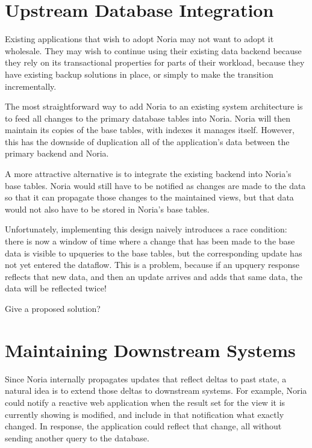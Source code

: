 \section{Upstream Database Integration}

Existing applications that wish to adopt Noria may not want to adopt it
wholesale. They may wish to continue using their existing data backend because
they rely on its transactional properties for parts of their workload, because
they have existing backup solutions in place, or simply to make the transition
incrementally.

The most straightforward way to add Noria to an existing system architecture is
to feed all changes to the primary database tables into Noria. Noria will then
maintain its copies of the base tables, with indexes it manages itself. However,
this has the downside of duplication all of the application's data between the
primary backend and Noria.

A more attractive alternative is to integrate the existing backend into Noria's
base tables. Noria would still have to be notified as changes are made to the
data so that it can propagate those changes to the maintained views, but that
data would not also have to be stored in Noria's base tables.

Unfortunately, implementing this design naively introduces a race condition:
there is now a window of time where a change that has been made to the base data
is visible to upqueries to the base tables, but the corresponding update has not
yet entered the dataflow. This is a problem, because if an upquery response
reflects that new data, and then an update arrives and adds that same data, the
data will be reflected twice!

\begin{inprogress}
  Give a proposed solution?
\end{inprogress}

\section{Maintaining Downstream Systems}

Since Noria internally propagates updates that reflect deltas to past state, a
natural idea is to extend those deltas to downstream systems. For example, Noria
could notify a reactive web application when the result set for the view it is
currently showing is modified, and include in that notification what exactly
changed. In response, the application could reflect that change, all without
sending another query to the database.

